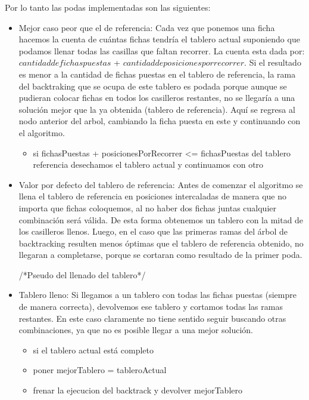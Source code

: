 Por lo tanto las podas implementadas son las siguientes:

\begin{itemize}

\item Mejor caso peor que el de referencia: Cada vez que ponemos una ficha hacemos la cuenta de cu\'antas fichas tendr\'ia el tablero actual suponiendo que podamos llenar todas las casillas que faltan recorrer. La cuenta esta dada por: $cantidad de fichas puestas$ + $cantidad de posiciones por recorrer$. Si el resultado es menor a la cantidad de fichas puestas en el tablero de referencia, la rama del backtraking que se ocupa de este tablero es podada porque aunque se pudieran colocar fichas en todos los casilleros restantes, no se llegar\'ia a una soluci\'on mejor que la ya obtenida (tablero de referencia). Aqu\'i se regresa al nodo anterior del arbol, cambiando la ficha puesta en este y continuando con el algoritmo.

\begin{itemize}
\item si fichasPuestas + posicionesPorRecorrer <= fichasPuestas del tablero referencia desechamos el tablero actual y continuamos con otro
\end{itemize}

\item Valor por defecto del tablero de referencia: Antes de comenzar el algoritmo se llena el tablero de referencia en posiciones intercaladas de manera que no importa que fichas coloquemos, al no haber dos fichas juntas cualquier combinaci\'on ser\'a v\'alida. De esta forma obtenemos un tablero con la mitad de los casilleros llenos. Luego, en el caso que las primeras ramas del \'arbol de backtracking resulten menos \'optimas que el tablero de referencia obtenido, no llegaran a completarse, porque se cortaran como resultado de la primer poda.

/*Pseudo del llenado del tablero*/

\item Tablero lleno: Si llegamos a un tablero con todas las fichas puestas (siempre de manera correcta), devolvemos ese tablero y cortamos todas las ramas restantes. En este caso claramente no tiene sentido seguir buscando otras combinaciones, ya que no es posible llegar a una mejor soluci\'on.
\begin{itemize}
\item si el tablero actual est\'a completo
\item poner mejorTablero = tableroActual
\item frenar la ejecucion del backtrack y devolver mejorTablero 
\end{itemize}

\end{itemize}


